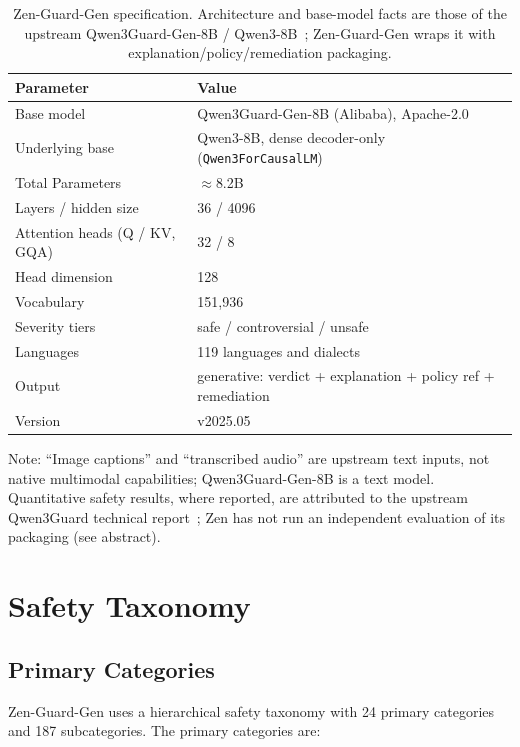 \documentclass[11pt,a4paper]{article}
\begin{document}
\begin{table}[H]
\centering
\caption{Zen-Guard-Gen specification. Architecture and base-model facts are those of the
upstream Qwen3Guard-Gen-8B / Qwen3-8B~\cite{qwen3guard}; Zen-Guard-Gen wraps it with
explanation/policy/remediation packaging.}
\begin{tabular}{ll}
\toprule
\textbf{Parameter} & \textbf{Value} \\
\midrule
Base model & Qwen3Guard-Gen-8B (Alibaba), Apache-2.0 \\
Underlying base & Qwen3-8B, dense decoder-only (\texttt{Qwen3ForCausalLM}) \\
Total Parameters & $\approx$8.2B \\
Layers / hidden size & 36 / 4096 \\
Attention heads (Q / KV, GQA) & 32 / 8 \\
Head dimension & 128 \\
Vocabulary & 151{,}936 \\
Severity tiers & safe / controversial / unsafe \\
Languages & 119 languages and dialects \\
Output & generative: verdict + explanation + policy ref + remediation \\
Version & v2025.05 \\
\bottomrule
\end{tabular}
\end{table}

Note: ``Image captions'' and ``transcribed audio'' are upstream text inputs, not native
multimodal capabilities; Qwen3Guard-Gen-8B is a text model. Quantitative safety results, where
reported, are attributed to the upstream Qwen3Guard technical report~\cite{qwen3guard}; Zen has
not run an independent evaluation of its packaging (see abstract).

\section{Safety Taxonomy}

\subsection{Primary Categories}

Zen-Guard-Gen uses a hierarchical safety taxonomy with 24 primary categories and 187 subcategories. The primary categories are:
\end{document}
